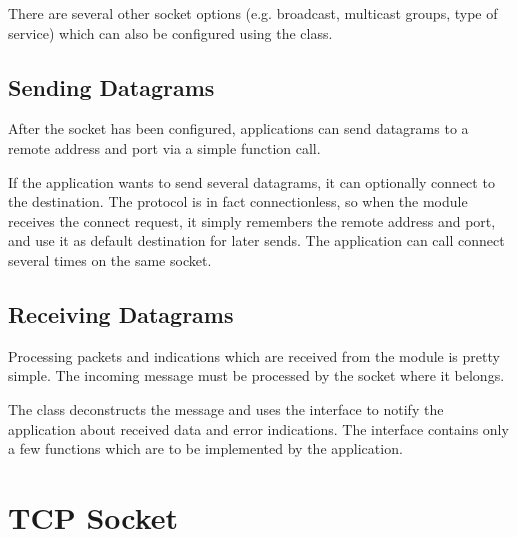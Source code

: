 
There are several other socket options (e.g. broadcast, multicast groups, type
of service) which can also be configured using the  class.

\subsection*{Sending Datagrams}

After the socket has been configured, applications can send datagrams to a
remote address and port via a simple function call.


If the application wants to send several datagrams, it can optionally connect to
the destination. The  protocol is in fact connectionless, so when
the  module receives the connect request, it simply remembers the
remote address and port, and use it as default destination for later sends.
The application can call connect several times on the same socket.


\subsection*{Receiving Datagrams}

Processing packets and indications which are received from the 
module is pretty simple. The incoming message must be processed by the socket
where it belongs.


The  class deconstructs the message and uses the
 interface to notify the application about
received data and error indications. The 
interface contains only a few functions which are to be implemented by the
application.


\section{TCP Socket}



